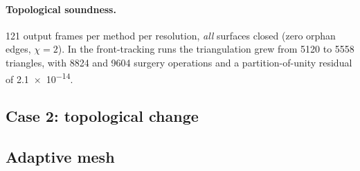 \paragraph{Topological soundness.}
121 output frames per method per resolution, \emph{all} surfaces closed (zero
orphan edges, $\chi = 2$). In the front-tracking runs the triangulation grew from
5120 to 5558 triangles, with 8824 and 9604 surgery operations and a
partition-of-unity residual of \num{2.1e-14}.

\subsection{Case 2: topological change}

\subsection{Adaptive mesh}
